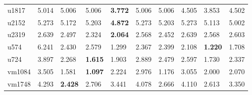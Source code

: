 \begin{tabular}{llllllllll}
u1817 & 5.014 & 5.006 & 5.006 & \textbf{3.772} & 5.006 & 5.006 & 4.505 & 3.853 & 4.502 \\
u2152 & 5.273 & 5.172 & 5.203 & \textbf{4.872} & 5.273 & 5.203 & 5.273 & 5.113 & 5.002 \\
u2319 & 2.639 & 2.497 & 2.324 & \textbf{2.064} & 2.568 & 2.452 & 2.639 & 2.568 & 2.603 \\
u574 & 6.241 & 2.430 & 2.579 & 1.299 & 2.367 & 2.399 & 2.108 & \textbf{1.220} & 1.708 \\
u724 & 3.897 & 2.268 & \textbf{1.615} & 1.903 & 2.889 & 2.479 & 2.597 & 1.730 & 2.337 \\
vm1084 & 3.505 & 1.581 & \textbf{1.097} & 2.224 & 2.976 & 1.176 & 3.055 & 2.000 & 2.070 \\
vm1748 & 4.293 & \textbf{2.428} & 2.706 & 3.441 & 4.078 & 2.666 & 4.110 & 2.613 & 3.350 \\
\bottomrule
\end{tabular}
